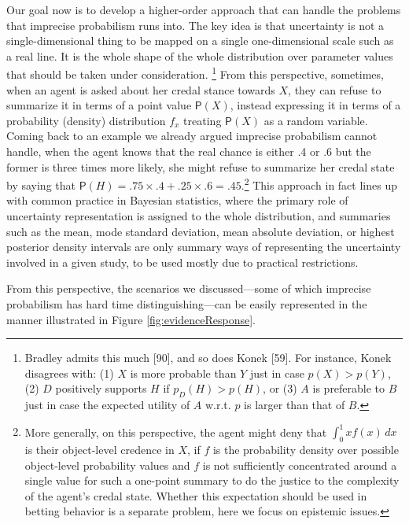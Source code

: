 \documentclass[
  10pt,
  dvipsnames,enabledeprecatedfontcommands]{scrartcl}
\begin{document}
Our goal now is to develop a higher-order approach that can handle the
problems that imprecise probabilism runs into. The key idea is that
uncertainty is not a single-dimensional thing to be mapped on a single
one-dimensional scale such as a real line. It is the whole shape of the
whole distribution over parameter values that should be taken under
consideration. \footnote{Bradley admits this much {[}90{]},
  and so does Konek {[}59{]}. For instance, Konek disagrees with: (1)
  \(X\) is more probable than \(Y\) just in case \(p(X)>p(Y)\), (2)
  \(D\) positively supports \(H\) if \(p_D(H)> p(H)\), or (3) \(A\) is
  preferable to \(B\) just in case the expected utility of \(A\) w.r.t.
  \(p\) is larger than that of \(B\).} From this perspective, sometimes,
when an agent is asked about her credal stance towards \(X\), they can
refuse to summarize it in terms of a point value \(\mathsf{P}(X)\),
instead expressing it in terms of a probability (density) distribution
\(f_x\) treating \(\mathsf{P}(X)\) as a random variable. Coming back to
an example we already argued imprecise probabilism cannot handle, when
the agent knows that the real chance is either .4 or .6 but the former
is three times more likely, she might refuse to summarize her credal
state by saying that
\(\mathsf{P}(H) = .75 \times .4 + .25 \times .6 = .45\).\footnote{More
  generally, on this perspective, the agent might deny that
  \(\int_{0}^{1} x f(x) \, dx\) is their object-level credence in \(X\),
  if \(f\) is the probability density over possible object-level
  probability values and \(f\) is not sufficiently concentrated around a
  single value for such a one-point summary to do the justice to the
  complexity of the agent's credal state. Whether this expectation
  should be used in betting behavior is a separate problem, here we
  focus on epistemic issues.} This approach in fact lines up with common
practice in Bayesian statistics, where the primary role of uncertainty
representation is assigned to the whole distribution, and summaries such
as the mean, mode standard deviation, mean absolute deviation, or
highest posterior density intervals are only summary ways of
representing the uncertainty involved in a given study, to be used
mostly due to practical restrictions.

From this perspective, the scenarios we discussed---some of which
imprecise probabilism has hard time distinguishing---can be easily
represented in the manner illustrated in Figure
\ref{fig:evidenceResponse}.
\end{document}
